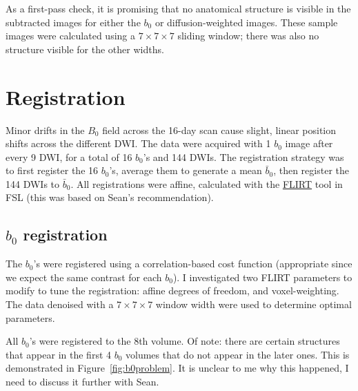 \documentclass{article}
\begin{document}
As a first-pass check, it is promising that no anatomical structure is visible
in the subtracted images for either the $b_0$ or diffusion-weighted
images. These sample images were calculated using a $7\times 7 \times 7$ sliding
window; there was also no structure visible for the other widths.

\section{Registration}
Minor drifts in the $B_0$ field across the 16-day scan cause slight, linear
position shifts across the different DWI. The data were acquired with 1
$b_0$ image after every 9 DWI, for a total of 16 $b_0$'s and 144 DWIs. The
registration strategy was to first register the 16 $b_0$'s, average them to
generate a mean $\bar{b}_0$, then register the 144 DWIs to $\bar{b}_0$. All
registrations were affine, calculated with the
\href{https://fsl.fmrib.ox.ac.uk/fsl/fslwiki/FLIRT}{FLIRT} \cite{Jenkinson2001,
  Jenkinson2002} tool in FSL (this was based on Sean's recommendation).


\subsection{$b_0$ registration}
The $b_0$'s were registered using a correlation-based cost function (appropriate
since we expect the same contrast for each $b_0$). I investigated two FLIRT
parameters to modify to tune the registration: affine degrees of freedom, and
voxel-weighting. The data denoised with a $7\times 7 \times 7$ window width
were used to determine optimal parameters. 

All $b_0$'s were registered to the 8th volume. Of note: there are certain
structures that appear in the first 4 $b_0$ volumes that do not appear
in the later ones. This is demonstrated in Figure~\ref{fig:b0problem}. It
is unclear to me why this happened, I need to discuss it further with Sean. 
\end{document}
